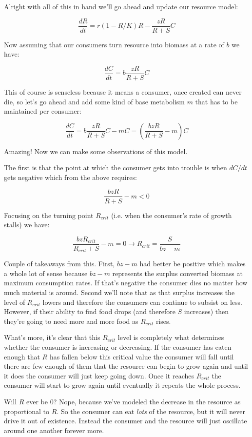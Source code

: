 \documentclass[11pt,a5paper]{book}
\begin{document}
Alright with all of this in hand we'll go ahead and update our resource model:

$$\frac{dR}{dt} = r(1-R/K)R-\frac{zR}{R+S}C$$

Now assuming that our consumers turn resource into biomass at a rate of $b$ we have:

$$\frac{dC}{dt}=b\frac{zR}{R+S}C$$

This of course is senseless because it means a consumer, once created can never die, so let's go ahead and add some kind of base metabolism $m$ that has to be maintained per consumer:

$$\frac{dC}{dt}=b\frac{zR}{R+S}C-mC=\left(\frac{bzR}{R+S} - m\right)C$$

Amazing! Now we can make some observations of this model. 
\newline

The first is that the point at which the consumer gets into trouble is when $dC/dt$ gets negative which from the above requires:

$$\frac{bzR}{R+S} - m < 0$$

Focusing on the turning point $R_{crit}$ (i.e. when the consumer's rate of growth stalls) we have:

$$\frac{bzR_{crit}}{R_{crit}+S} - m = 0 \rightarrow R_{crit}=\frac{S}{bz-m}$$

Couple of takeaways from this. First, $bz-m$ had better be positive which makes a whole lot of sense because $bz-m$ represents the surplus converted biomass at maximum consumption rates. If that's negative the consumer dies no matter how much material is around. Second we'll note that as that surplus increases the level of $R_{crit}$ lowers and therefore the consumers can continue to subsist on less. However, if their ability to find food drops (and therefore $S$ increases) then they're going to need more and more food as $R_{crit}$ rises. 

What's more, it's clear that this $R_{crit}$ level is completely what determines whether the consumer is increasing or decreasing. If the consumer has eaten enough that $R$ has fallen below this critical value the consumer will fall until there are few enough of them that the resource can begin to grow again and until it does the consumer will just keep going down. Once it reaches $R_{crit}$ the consumer will start to grow again until eventually it repeats the whole process. 

Will $R$ ever be $0$? Nope, because we've modeled the decrease in the resource as proportional to $R$. So the consumer can eat \textit{lots} of the resource, but it will never drive it out of existence. Instead the consumer and the resource will just oscillate around one another forever more. 
\end{document}
